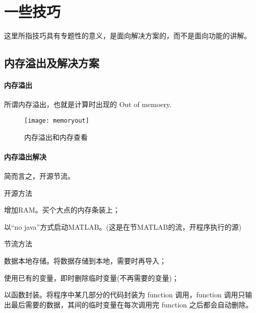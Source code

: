 \section{一些技巧}

这里所指技巧具有专题性的意义，是面向解决方案的，而不是面向功能的讲解。





\subsection{内存溢出及解决方案}

\paragraph{内存溢出}所谓内存溢出，也就是计算时出现的 Out of memoery.

\begin{figure}[htbp]
\texttt{[image: memoryout]}
\caption{内存溢出和内存查看}
\end{figure}

\vspace{-0.8cm}




\paragraph{内存溢出解决} 简而言之，开源节流。

\begindot
  \item 开源方法
    \begin{itemize*}
    \item 增加RAM。买个大点的内存条装上；
    \item 以“no java”方式启动MATLAB。(这是在节MATLAB的流，开程序执行的源)
    \end{itemize*}
  \item 节流方法
    \begin{itemize*}
    \item 数据本地存储。将数据存储到本地，需要时再导入；
    \item 使用已有的变量，即时删除临时变量(不再需要的变量)；
    \item 以函数封装。将程序中某几部分的代码封装为 function 调用，function 调用只输出最后需要的数据，其间的临时变量在每次调用完 function 之后都会自动删除。
    \end{itemize*}
\myenddot





